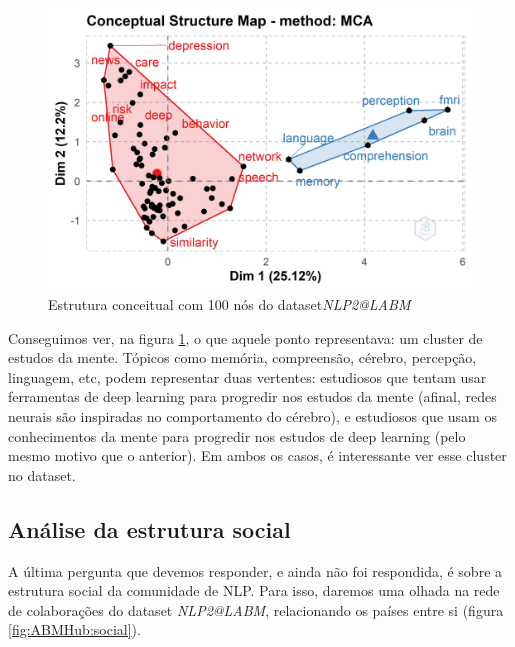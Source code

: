  \begin{figure}
    \centering
    \includegraphics[width=1\textwidth]{experiments/ABMHub/PesquisaBibliometrica/NLP/estruturaConceitual2.png}
    \caption{Estrutura conceitual com 100 nós do dataset\textit{NLP2@LABM}}
    \label{fig:ABMHub:EC2}
\end{figure}

Conseguimos ver, na figura \ref{fig:ABMHub:EC2}, o que aquele ponto representava: um cluster de estudos da mente. Tópicos como memória, compreensão, cérebro, percepção, linguagem, etc, podem representar duas vertentes: estudiosos que tentam usar ferramentas de deep learning para progredir nos estudos da mente (afinal, redes neurais são inspiradas no comportamento do cérebro), e estudiosos que usam os conhecimentos da mente para progredir nos estudos de deep learning (pelo mesmo motivo que o anterior). Em ambos os casos, é interessante ver esse cluster no dataset.

\subsection{Análise da estrutura social}

A última pergunta que devemos responder, e ainda não foi respondida, é sobre a estrutura social da comunidade de NLP. Para isso, daremos uma olhada na rede de colaborações do dataset \textit{NLP2@LABM}, relacionando os países entre si (figura \ref{fig:ABMHub:social}).


